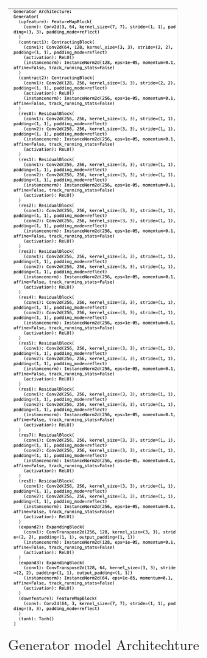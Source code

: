 \documentclass[UKenglish,12pt]{master-style}
\begin{document}
\begin{figure}[htbp]
    \centering
    \includegraphics[width=0.4\textwidth]{Images/Generator_architechture.png}
    \caption{Generator model Architechture}
    \label{fig:Generator_architechture}
\end{figure}
\end{document}
